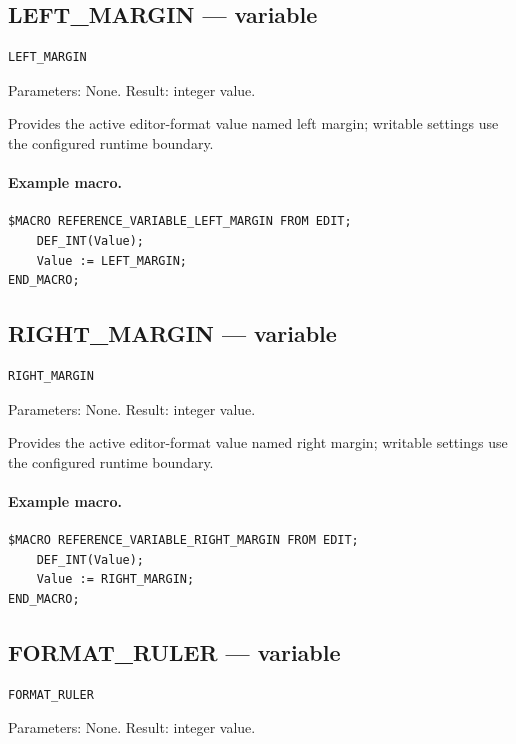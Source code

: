 \documentclass[a4paper,10pt,twoside,openany]{book}
\begin{document}
\label{prim:variable-left-margin}
\subsection*{LEFT\_MARGIN --- variable}
\begin{verbatim}
LEFT_MARGIN
\end{verbatim}
Parameters: None. Result: integer value.

Provides the active editor-format value named left margin; writable settings use the configured runtime boundary.

\paragraph{Example macro.}
\begin{verbatim}
$MACRO REFERENCE_VARIABLE_LEFT_MARGIN FROM EDIT;
    DEF_INT(Value);
    Value := LEFT_MARGIN;
END_MACRO;
\end{verbatim}

\label{prim:variable-right-margin}
\subsection*{RIGHT\_MARGIN --- variable}
\begin{verbatim}
RIGHT_MARGIN
\end{verbatim}
Parameters: None. Result: integer value.

Provides the active editor-format value named right margin; writable settings use the configured runtime boundary.

\paragraph{Example macro.}
\begin{verbatim}
$MACRO REFERENCE_VARIABLE_RIGHT_MARGIN FROM EDIT;
    DEF_INT(Value);
    Value := RIGHT_MARGIN;
END_MACRO;
\end{verbatim}

\label{prim:variable-format-ruler}
\subsection*{FORMAT\_RULER --- variable}
\begin{verbatim}
FORMAT_RULER
\end{verbatim}
Parameters: None. Result: integer value.
\end{document}
